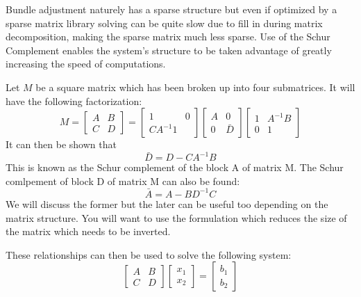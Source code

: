 \documentclass[peerreview,compsoc,onecolumn]{IEEEtran}
\begin{document}
Bundle adjustment naturely has a sparse structure \cite{triggs1999bundle} but even if optimized by a sparse matrix library solving can be quite slow due to fill in during matrix decomposition, making the sparse matrix much less sparse. Use of the Schur Complement enables the system's structure to be taken advantage of greatly increasing the speed of computations.

Let $M$ be a square matrix which has been broken up into four submatrices. It will have the following factorization:
\begin{equation}
M = \begin{bmatrix}
A & B \\
C & D
\end{bmatrix}
=
\begin{bmatrix}
1 & 0 \\
C A^{-1} 1
\end{bmatrix}
\begin{bmatrix}
A & 0 \\
0 & \bar{D}
\end{bmatrix}
\begin{bmatrix}
1 & A^{-1}B \\
0 & 1
\end{bmatrix}
\end{equation}
It can then be shown that
\begin{equation}
\bar{D} = D - C A^{-1}B
\end{equation}
This is known as the Schur complement of the block A of matrix M. The Schur comlpement of block D of matrix M can also be found:
\begin{equation}
\bar{A} = A - B D^{-1}C
\end{equation}
We will discuss the former but the later can be useful too depending on the matrix structure. You will want to use the formulation which reduces the size of the matrix which needs to be inverted.

These relationships can then be used to solve the following system:
\begin{equation}
\begin{bmatrix}
A & B \\
C & D
\end{bmatrix}
\begin{bmatrix}
x_1 \\ x_2
\end{bmatrix}
=
\begin{bmatrix}
b_1 \\ b_2
\end{bmatrix}
\end{equation}
\end{document}
